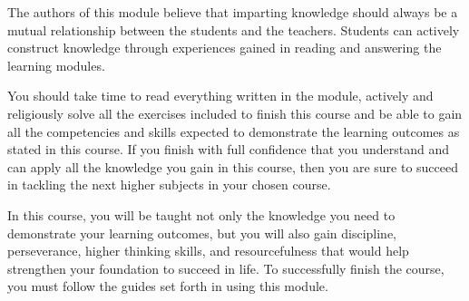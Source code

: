 The authors of this module believe that imparting knowledge should always be a mutual relationship between the students and the teachers. Students can actively construct knowledge through experiences gained in reading and answering the learning modules.

You should take time to read everything written in the module, actively and religiously solve all the exercises included to finish this course and be able to gain all the competencies and skills expected to demonstrate the learning outcomes as stated in this course. If you finish with full confidence that you understand and can apply all the knowledge you gain in this course, then you are sure to succeed in tackling the next higher subjects in your chosen course.

In this course, you will be taught not only the knowledge you need to demonstrate your learning outcomes, but you will also gain discipline, perseverance, higher thinking skills, and resourcefulness that would help strengthen your foundation to succeed in life. To successfully finish the course, you must follow the guides set forth in using this module.


